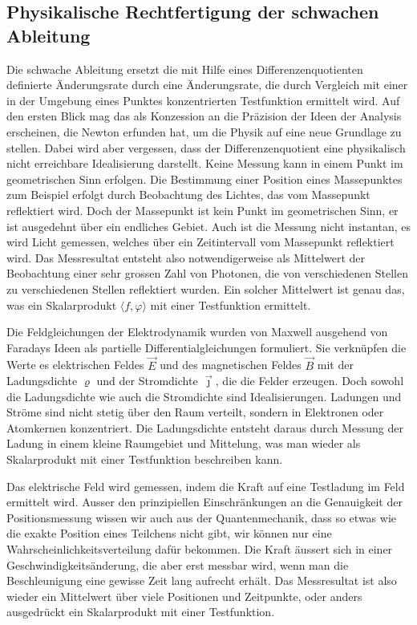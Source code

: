 \subsection{Physikalische Rechtfertigung der schwachen Ableitung}
Die schwache Ableitung ersetzt die mit Hilfe eines Differenzenquotienten
definierte Änderungsrate durch eine Änderungsrate, die durch Vergleich
mit einer in der Umgebung eines Punktes konzentrierten Testfunktion
ermittelt wird.
Auf den ersten Blick mag das als Konzession an die Präzision der Ideen
der Analysis erscheinen, die Newton erfunden hat, um die Physik auf eine
neue Grundlage zu stellen.
Dabei wird aber vergessen, dass der Differenzenquotient eine physikalisch
nicht erreichbare Idealisierung darstellt.
Keine Messung kann in einem Punkt im geometrischen Sinn erfolgen.
Die Bestimmung einer Position eines Massepunktes zum Beispiel erfolgt
durch Beobachtung des Lichtes, das vom Massepunkt reflektiert wird.
Doch der Massepunkt ist kein Punkt im geometrischen Sinn, er ist ausgedehnt
über ein endliches Gebiet.
Auch ist die Messung nicht instantan, es wird Licht gemessen, welches
über ein Zeitintervall vom Massepunkt reflektiert wird.
Das Messresultat entsteht also notwendigerweise als Mittelwert der
Beobachtung einer sehr grossen Zahl von Photonen, die von verschiedenen
Stellen zu verschiedenen Stellen reflektiert wurden.
Ein solcher Mittelwert ist genau das, was ein Skalarprodukt
$\langle f,\varphi\rangle$ mit einer Testfunktion ermittelt.

Die Feldgleichungen der Elektrodynamik wurden von Maxwell ausgehend
von Faradays Ideen als partielle Differentialgleichungen formuliert.
Sie verknüpfen die Werte es elektrischen Feldes $\vec{E}$ und des
magnetischen Feldes $\vec{B}$ mit der Ladungsdichte $\varrho$
und der Stromdichte $\vec{\jmath}$, die die Felder erzeugen.
Doch sowohl die Ladungsdichte wie auch die Stromdichte sind Idealisierungen.
Ladungen und Ströme sind nicht stetig über den Raum verteilt, sondern 
in Elektronen oder Atomkernen konzentriert.
Die Ladungsdichte entsteht daraus durch Messung der Ladung in einem kleine
Raumgebiet und Mittelung, was man wieder als Skalarprodukt mit einer
Testfunktion beschreiben kann.

Das elektrische Feld wird gemessen, indem die Kraft auf eine Testladung
im Feld ermittelt wird.
Ausser den prinzipiellen Einschränkungen an die Genauigkeit der
Positionsmessung wissen wir auch aus der Quantenmechanik, dass so etwas
wie die exakte Position eines Teilchens nicht gibt, wir können nur eine
Wahrscheinlichkeitsverteilung dafür bekommen.
Die Kraft äussert sich in einer Geschwindigkeitsänderung, die aber erst
messbar wird, wenn man die Beschleunigung eine gewisse Zeit lang aufrecht
erhält.
Das Messresultat ist also wieder ein Mittelwert über viele Positionen
und Zeitpunkte, oder anders ausgedrückt ein Skalarprodukt mit einer
Testfunktion.

